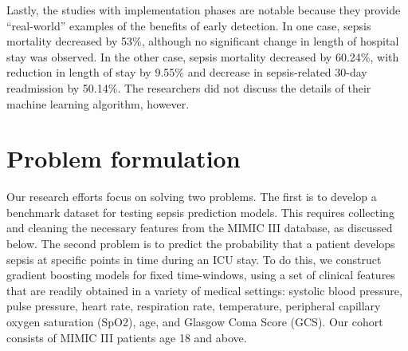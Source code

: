 \documentclass{amia}
\begin{document}
	 Lastly, the studies with implementation phases
	are notable because they provide ``real-world'' examples
	of the benefits of early detection.  
	 In one case, sepsis mortality decreased by 53\%, although no significant change
	in length of hospital stay was observed.\cite{manaktala2016}
	 In the other case, sepsis mortality decreased by 60.24\%,
	with reduction in length of stay by 9.55\% and decrease in
	sepsis-related 30-day readmission by 50.14\%.\cite{mccoy2017}
	 The researchers did not discuss the details of their machine
	learning algorithm, however.

\section{Problem formulation}

         Our research efforts focus on solving two problems.
         The first is to develop a benchmark dataset for testing
         sepsis prediction models.  This requires collecting 
         and cleaning the necessary features from the MIMIC III 
         database, as discussed below.  The second problem
         is to predict the probability that a patient 
         develops sepsis at specific points in time during an ICU stay.  
         To do this, we construct gradient boosting models for 
         fixed time-windows, using a set of clinical features 
         that are readily obtained in a variety of medical settings:\cite{desautels2016}
         systolic blood pressure, pulse pressure, 
         heart rate, respiration rate, temperature, peripheral capillary oxygen saturation (SpO2), 
         age, and Glasgow Coma Score (GCS).  Our cohort consists of MIMIC III patients age 18 and above.
\end{document}
